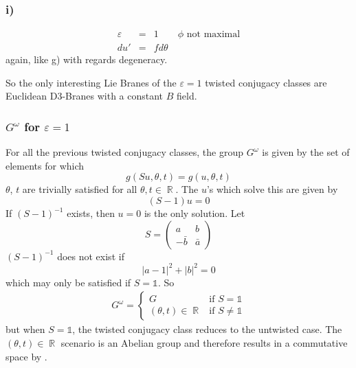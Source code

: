 \documentclass[11pt, a4paper]{article}
\DeclareMathOperator{\real}{{\mathbb R}}
\newcommand{\1}{\mathbb{1}}
\begin{document}
\subsubsection{i)}
\begin{eqnarray}
  \label{eq:i}
  \varepsilon&=&1\qquad \text{$\phi$ not maximal}\\\nonumber
  du'&=&fd\theta
\end{eqnarray}
again, like g) with regards degeneracy.

So the only interesting Lie Branes of the $\varepsilon=1$ twisted conjugacy
classes are Euclidean D3-Branes with a constant $B$ field.

\subsubsection{$G^\omega$ for $\varepsilon=1$}
For all the previous twisted conjugacy classes, the group $G^\omega$ is given by
the set of elements for which
\begin{equation}
  \label{eq:Gomega:1}
  g(Su,\theta,t)=g(u,\theta,t)
\end{equation}
$\theta$, $t$ are trivially satisfied for all $\theta, t \in \real$. The $u$'s
which solve this are given by
\begin{equation}
  \label{eq:ep1:1}
  (S-1)u=0
\end{equation}
If $(S-1)^{-1}$ exists, then $u=0$ is the only solution. Let
\begin{equation}
  \label{eq:ep1:S}
  S=\begin{pmatrix}
    a & b \\
    -\bar b & \bar a
    \end{pmatrix}
\end{equation}
$(S-1)^{-1}$ does not exist if
\begin{equation}
  \label{eq:ep1:inverse}
  |a-1|^2+|b|^2=0
\end{equation}
which may only be satisfied if $S=\1$. So
\begin{eqnarray}
  \label{eq:ep1:sol}
  G^\omega =
  \begin{cases}
    G & \text{if $S=\1$}\\
    (\theta, t) \in \real & \text{if $S\neq\1$}
  \end{cases}
\end{eqnarray}
but when $S=\1$, the twisted conjugacy class reduces to the untwisted case. The
$(\theta, t)\in\real$ scenario is an Abelian group and therefore results in a
commutative space by \cite{Alekseev:2002rj}.
\end{document}
